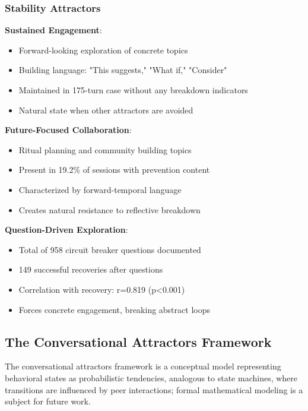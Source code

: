 \documentclass[11pt,letterpaper]{article}
\newcommand{\exponedataQuestionCorrelation}{0.819}
\newcommand{\exponedataQuestionPValue}{p\textless0.001}
\newcommand{\exponedataNegativeCase}{175}
\newcommand{\exponedataTotalQuestions}{958}
\newcommand{\exponedataTotalRecoveries}{149}
\newcommand{\exponedataPreventionContentPercentage}{19.2\%}
\begin{document}
\subsubsection{Stability Attractors}

\textbf{Sustained Engagement}:
\begin{itemize}
    \item Forward-looking exploration of concrete topics
    \item Building language: "This suggests," "What if," "Consider"
    \item Maintained in \exponedataNegativeCase{}-turn case without any breakdown indicators
    \item Natural state when other attractors are avoided
\end{itemize}

\textbf{Future-Focused Collaboration}:
\begin{itemize}
    \item Ritual planning and community building topics
    \item Present in \exponedataPreventionContentPercentage{} of sessions with prevention content
    \item Characterized by forward-temporal language
    \item Creates natural resistance to reflective breakdown
\end{itemize}

\textbf{Question-Driven Exploration}:
\begin{itemize}
    \item Total of \exponedataTotalQuestions{} circuit breaker questions documented
    \item \exponedataTotalRecoveries{} successful recoveries after questions
    \item Correlation with recovery: r=\exponedataQuestionCorrelation{} (\exponedataQuestionPValue{})
    \item Forces concrete engagement, breaking abstract loops
\end{itemize}

\subsection{The Conversational Attractors Framework}
The conversational attractors framework is a conceptual model representing behavioral states as probabilistic tendencies, analogous to state machines, where transitions are influenced by peer interactions; formal mathematical modeling is a subject for future work.
\end{document}
